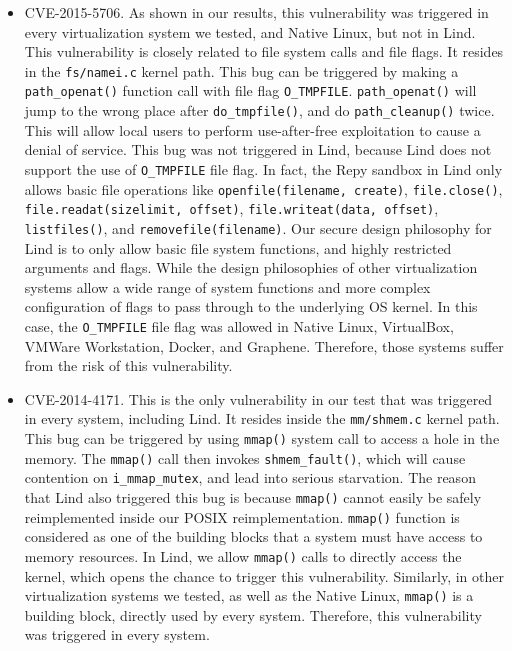 \begin{itemize}
\item CVE-2015-5706. As shown in our results, this vulnerability was triggered in every 
virtualization system we tested, and Native Linux, but not in Lind. This vulnerability 
is closely related to file system calls and file flags. It resides in the \texttt{fs/namei.c} 
kernel path. This bug can be triggered by making a \texttt{path\_openat()} function 
call with file flag \texttt{O\_TMPFILE}. \texttt{path\_openat()} will jump to the wrong 
place after \texttt{do\_tmpfile()}, and do \texttt{path\_cleanup()} twice. This will 
allow local users to perform use-after-free exploitation to cause a denial of service. 
This bug was not triggered in Lind, because Lind does not support the use of 
\texttt{O\_TMPFILE} file flag. In fact, the Repy sandbox in Lind only allows 
basic file operations like 
\texttt{openfile(filename, create)}, \texttt{file.close()}, \texttt{file.readat(sizelimit, offset)}, 
\texttt{file.writeat(data, offset)}, \texttt{listfiles()}, and \texttt{removefile(filename)}.  
Our secure design philosophy for Lind is to only allow basic file system functions, 
and highly restricted arguments and flags. While the design philosophies of other virtualization 
systems allow a wide range of system functions and more complex configuration of flags to 
pass through to the underlying OS kernel. In this case, the \texttt{O\_TMPFILE} file flag was 
allowed in Native Linux, VirtualBox, VMWare Workstation, Docker, and Graphene. Therefore, 
those systems suffer from the risk of this vulnerability.

\item CVE-2014-4171. This is the only vulnerability in our test that was triggered in every 
system, including Lind. It resides inside the \texttt{mm/shmem.c} kernel path. This bug can 
be triggered by using \texttt{mmap()} system call to access a hole in the memory. 
The \texttt{mmap()} call then invokes \texttt{shmem\_fault()}, which will cause contention 
on \texttt{i\_mmap\_mutex}, and lead into serious starvation.  
The reason that Lind also triggered this bug is because \texttt{mmap()} cannot easily 
be safely reimplemented inside our POSIX reimplementation. \texttt{mmap()} function is considered 
as one of the building blocks that a system must have access to memory resources. 
In Lind, we allow \texttt{mmap()} calls to directly access the kernel, which opens the chance 
to trigger this vulnerability. Similarly, in other virtualization systems we tested, as well as the Native 
Linux, \texttt{mmap()} is a building block, directly used by every system. Therefore, this vulnerability was 
triggered in every system. 


\end{itemize}
